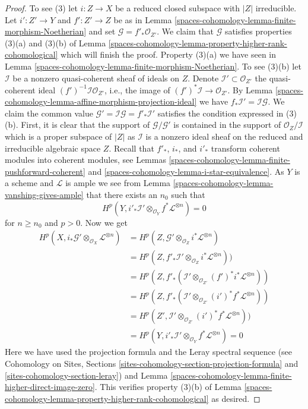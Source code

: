 \begin{proof}
\medskip\noindent
To see (3) let $i : Z \to X$ be a reduced closed subspace with $|Z|$
irreducible. Let $i' : Z' \to Y$ and $f' : Z' \to Z$ be as in
Lemma \ref{spaces-cohomology-lemma-finite-morphism-Noetherian} and set
$\mathcal{G} = f'_*\mathcal{O}_{Z'}$. We claim that
$\mathcal{G}$ satisfies properties (3)(a) and (3)(b) of
Lemma \ref{spaces-cohomology-lemma-property-higher-rank-cohomological}
which will finish the proof. Property (3)(a) we have seen in
Lemma \ref{spaces-cohomology-lemma-finite-morphism-Noetherian}. To see (3)(b) let
$\mathcal{I}$ be a nonzero quasi-coherent sheaf of ideals on $Z$.
Denote $\mathcal{I}' \subset \mathcal{O}_{Z'}$ the quasi-coherent
ideal $(f')^{-1}\mathcal{I} \mathcal{O}_{Z'}$, i.e., the
image of $(f')^*\mathcal{I} \to \mathcal{O}_{Z'}$.
By Lemma \ref{spaces-cohomology-lemma-affine-morphism-projection-ideal} we have
$f_*\mathcal{I}' = \mathcal{I} \mathcal{G}$. We claim the common value
$\mathcal{G}' = \mathcal{I} \mathcal{G} = f'_*\mathcal{I}'$
satisfies the condition expressed in (3)(b).
First, it is clear that the support of $\mathcal{G}/\mathcal{G}'$
is contained in the support of $\mathcal{O}_Z/\mathcal{I}$
which is a proper subspace of $|Z|$ as $\mathcal{I}$ is a
nonzero ideal sheaf on the reduced and irreducible algebraic space $Z$.
Recall that $f'_*$, $i_*$, and $i'_*$ transform coherent modules into
coherent modules, see Lemmas \ref{spaces-cohomology-lemma-finite-pushforward-coherent} and
\ref{spaces-cohomology-lemma-i-star-equivalence}.
As $Y$ is a scheme and $\mathcal{L}$ is ample
we see from Lemma \ref{spaces-cohomology-lemma-vanshing-gives-ample}
that there exists an $n_0$ such that
$$
H^p(Y, i'_*\mathcal{I}' \otimes_{\mathcal{O}_Y} f^*\mathcal{L}^{\otimes n}) = 0
$$
for $n \geq n_0$ and $p > 0$. Now we get
\begin{align*}
H^p(X, i_*\mathcal{G}' \otimes_{\mathcal{O}_X} \mathcal{L}^{\otimes n})
& =
H^p(Z, \mathcal{G'} \otimes_{\mathcal{O}_Z} i^*\mathcal{L}^{\otimes n}) \\
& =
H^p(Z,
f'_*\mathcal{I}' \otimes_{\mathcal{O}_Z} i^*\mathcal{L}^{\otimes n})) \\
& =
H^p(Z, f'_*(\mathcal{I}' \otimes_{\mathcal{O}_{Z'}}
(f')^*i^*\mathcal{L}^{\otimes n})) \\
& =
H^p(Z, f'_*(\mathcal{I}' \otimes_{\mathcal{O}_{Z'}}
(i')^*f^*\mathcal{L}^{\otimes n})) \\
& =
H^p(Z',
\mathcal{I}' \otimes_{\mathcal{O}_{Z'}} (i')^*f^*\mathcal{L}^{\otimes n})) \\
& =
H^p(Y, i'_*\mathcal{I}' \otimes_{\mathcal{O}_Y} f^*\mathcal{L}^{\otimes n}) = 0
\end{align*}
Here we have used the projection formula and the Leray spectral sequence
(see Cohomology on Sites, Sections
\ref{sites-cohomology-section-projection-formula} and
\ref{sites-cohomology-section-leray})
and Lemma \ref{spaces-cohomology-lemma-finite-higher-direct-image-zero}.
This verifies property (3)(b) of
Lemma \ref{spaces-cohomology-lemma-property-higher-rank-cohomological} as desired.
\end{proof}

